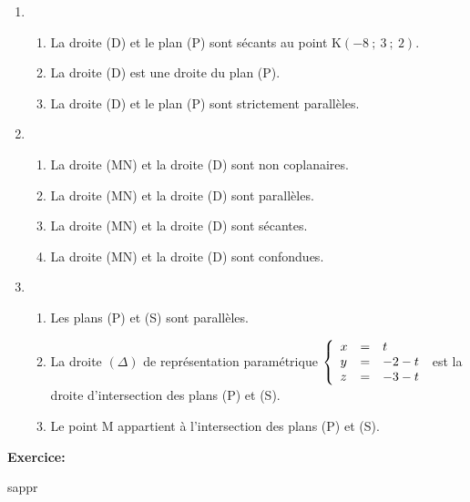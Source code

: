 \documentclass{cornouaille}
\begin{document}
\begin{exercice}
\begin{enumerate}
              \item
                \begin{enumerate}
		\item La droite (D) et le plan (P) sont sécants au
                  point K$(- 8~;~3~;~2)$.
		\item La droite (D) est une droite du plan (P).
		\item La droite (D) et le plan (P) sont strictement
                  parallèles.
                \end{enumerate}
              \item
                \begin{enumerate}
		\item La droite (MN) et la droite (D) sont non
                  coplanaires.
		\item La droite (MN) et la droite (D) sont parallèles.
		\item La droite (MN) et la droite (D) sont sécantes.
		\item La droite (MN) et la droite (D) sont confondues.
                \end{enumerate}
              \item
                \begin{enumerate}
		\item Les plans (P) et (S) sont parallèles.
		\item La droite $(\Delta)$ de représentation
                  paramétrique
                  $\left\{\begin{array}{l c l}x&=&t\\y&=&- 2 - t\\z
                      &=& -3-t \end{array}\right.$
                  est la droite d'intersection des plans (P) et (S).
		\item Le point M appartient à l'intersection des plans
                  (P) et (S).
		
                \end{enumerate}
              \end{enumerate}
            \end{exercice}







\textbf{Exercice:}

sappr
\end{document}
